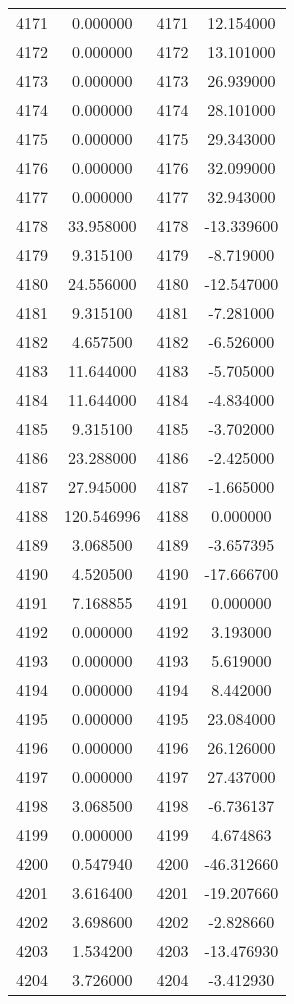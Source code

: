 \documentclass[12pt]{article}
\begin{document}
\begin{longtable}{@{}cccc@{}}
4171 & 0.000000 & 4171 & 12.154000 \\
4172 & 0.000000 & 4172 & 13.101000 \\
4173 & 0.000000 & 4173 & 26.939000 \\
4174 & 0.000000 & 4174 & 28.101000 \\
4175 & 0.000000 & 4175 & 29.343000 \\
4176 & 0.000000 & 4176 & 32.099000 \\
4177 & 0.000000 & 4177 & 32.943000 \\
4178 & 33.958000 & 4178 & -13.339600 \\
4179 & 9.315100 & 4179 & -8.719000 \\
4180 & 24.556000 & 4180 & -12.547000 \\
4181 & 9.315100 & 4181 & -7.281000 \\
4182 & 4.657500 & 4182 & -6.526000 \\
4183 & 11.644000 & 4183 & -5.705000 \\
4184 & 11.644000 & 4184 & -4.834000 \\
4185 & 9.315100 & 4185 & -3.702000 \\
4186 & 23.288000 & 4186 & -2.425000 \\
4187 & 27.945000 & 4187 & -1.665000 \\
4188 & 120.546996 & 4188 & 0.000000 \\
4189 & 3.068500 & 4189 & -3.657395 \\
4190 & 4.520500 & 4190 & -17.666700 \\
4191 & 7.168855 & 4191 & 0.000000 \\
4192 & 0.000000 & 4192 & 3.193000 \\
4193 & 0.000000 & 4193 & 5.619000 \\
4194 & 0.000000 & 4194 & 8.442000 \\
4195 & 0.000000 & 4195 & 23.084000 \\
4196 & 0.000000 & 4196 & 26.126000 \\
4197 & 0.000000 & 4197 & 27.437000 \\
4198 & 3.068500 & 4198 & -6.736137 \\
4199 & 0.000000 & 4199 & 4.674863 \\
4200 & 0.547940 & 4200 & -46.312660 \\
4201 & 3.616400 & 4201 & -19.207660 \\
4202 & 3.698600 & 4202 & -2.828660 \\
4203 & 1.534200 & 4203 & -13.476930 \\
4204 & 3.726000 & 4204 & -3.412930 \\

\end{longtable}
\end{document}

